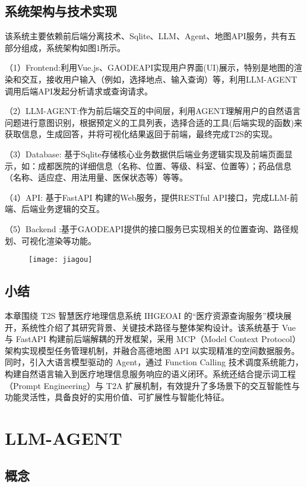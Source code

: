\documentclass[fleqn,10pt]{IntroToAI} %
\begin{document}
\subsection{系统架构与技术实现}

该系统主要依赖前后端分离技术、Sqlite、LLM、Agent、地图API服务，共有五部分组成，系统架构如图1所示。

（1）Frontend:利用Vue.js、GAODEAPI实现用户界面(UI)展示，特别是地图的渲染和交互，接收用户输入（例如，选择地点、输入查询）等，利用LLM-AGENT调用后端API发起分析请求或查询请求。

（2）LLM-AGENT:作为前后端交互的中间层，利用AGENT理解用户的自然语言问题进行意图识别，根据预定义的工具列表，选择合适的工具(后端实现的函数)来获取信息，生成回答，并将可视化结果返回于前端，最终完成T2S的实现。

（3）Database: 基于Sqlite存储核心业务数据供后端业务逻辑实现及前端页面显示，如：成都医院的详细信息（名称、位置、等级、科室、位置等）；药品信息（名称、适应症、用法用量、医保状态等）等等。

（4）API: 基于FastAPI 构建的Web服务，提供RESTful API接口，完成LLM-前端、后端业务逻辑的交互。

（5）Backend :基于GAODEAPI提供的接口服务已实现相关的位置查询、路径规划、可视化渲染等功能。

\begin{figure}
	\centering
	\texttt{[image: jiagou]}
	\caption[系统架构]{}
	\label{fig:jiagou}
\end{figure}


\subsection{小结}
本章围绕 T2S 智慧医疗地理信息系统 IHGEOAI 的“医疗资源查询服务”模块展开，系统性介绍了其研究背景、关键技术路径与整体架构设计。该系统基于 Vue 与 FastAPI 构建前后端解耦的开发框架，采用 MCP（Model Context Protocol）架构实现模型任务管理机制，并融合高德地图 API 以实现精准的空间数据服务。同时，引入大语言模型驱动的 Agent，通过 Function Calling 技术调度系统能力，构建自然语言输入到医疗地理信息服务响应的语义闭环。系统还结合提示词工程（Prompt Engineering）与 T2A 扩展机制，有效提升了多场景下的交互智能性与功能灵活性，具备良好的实用价值、可扩展性与智能化特征。
\section{LLM-AGENT}
\subsection{概念}
\end{document}
